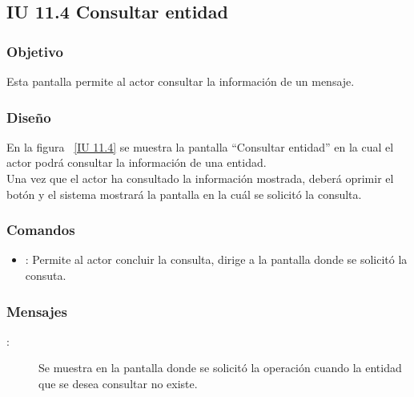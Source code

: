 \newpage 
\subsection{IU 11.4 Consultar entidad}

\subsubsection{Objetivo}
	
	Esta pantalla permite al actor consultar la información de un mensaje.
	
\subsubsection{Diseño}

    En la figura ~\ref{IU 11.4} se muestra la pantalla ``Consultar entidad'' en la cual el actor podrá consultar la información de una entidad.\\
	
	Una vez que el actor ha consultado la información mostrada, deberá oprimir el botón  y el sistema mostrará la pantalla en la cuál se solicitó la consulta.


\subsubsection{Comandos}
\begin{itemize}
	\item {}: Permite al actor concluir la consulta, dirige a la pantalla donde se solicitó la consuta.
\end{itemize}

\subsubsection{Mensajes}
	
\begin{description}
	\item[:] Se muestra en la pantalla donde se solicitó la operación cuando la entidad que se desea consultar no existe.
\end{description}

